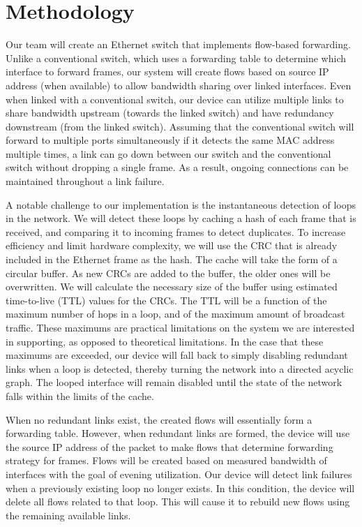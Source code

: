 \section{Methodology}
	Our team will create an Ethernet switch that implements flow-based forwarding.
	Unlike a conventional switch, which uses a forwarding table to determine which interface to forward frames, our system will create flows based on source IP address (when available) to allow bandwidth sharing over linked interfaces.
	Even when linked with a conventional switch, our device can utilize multiple links to share bandwidth upstream (towards the linked switch) and have redundancy downstream (from the linked switch).
	Assuming that the conventional switch will forward to multiple ports simultaneously if it detects the same MAC address multiple times, a link can go down between our switch and the conventional switch without dropping a single frame.
	As a result, ongoing connections can be maintained throughout a link failure.

	A notable challenge to our implementation is the instantaneous detection of loops in the network.
	We will detect these loops by caching a hash of each frame that is received, and comparing it to incoming frames to detect duplicates.
	To increase efficiency and limit hardware complexity, we will use the CRC that is already included in the Ethernet frame as the hash.
	The cache will take the form of a circular buffer.
	As new CRCs are added to the buffer, the older ones will be overwritten.
	We will calculate the necessary size of the buffer using estimated time-to-live (TTL) values for the CRCs.
	The TTL will be a function of the maximum number of hops in a loop, and of the maximum amount of broadcast traffic.
	These maximums are practical limitations on the system we are interested in supporting, as opposed to theoretical limitations.
	In the case that these maximums are exceeded, our device will fall back to simply disabling redundant links when a loop is detected, thereby turning the network into a directed acyclic graph.
	The looped interface will remain disabled until the state of the network falls within the limits of the cache.
	
	When no redundant links exist, the created flows will essentially form a forwarding table.
	However, when redundant links are formed, the device will use the source IP address of the packet to make flows that determine forwarding strategy for frames.
	Flows will be created based on measured bandwidth of interfaces with the goal of evening utilization.
	Our device will detect link failures when a previously existing loop no longer exists.
	In this condition, the device will delete all flows related to that loop.
	This will cause it to rebuild new flows using the remaining available links.

